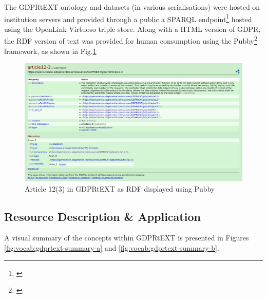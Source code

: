 The GDPRtEXT ontology and datasets (in various serialisations) were hosted on institution servers and provided through a public a SPARQL endpoint\footnote{\url{}} hosted using the OpenLink Virtuoso triple-store.
Along with a HTML version of GDPR, the RDF version of text was provided for human consumption using the Pubby\footnote{\url{}} framework, as shown in Fig.\ref{fig:vocab:gdprtext-pubby}
\begin{figure}[htbp]
    \centering
    \includegraphics[width=\linewidth]{img/gdprtext-pubby}
    \caption{Article 12(3) in GDPRtEXT as RDF displayed using Pubby \cite{}}
    \label{fig:vocab:gdprtext-pubby}
\end{figure}

\subsection{Resource Description \& Application}
A visual summary of the concepts within GDPRtEXT is presented in Figures \ref{fig:vocab:gdprtext-summary-a} and \ref{fig:vocab:gdprtext-summary-b}.

